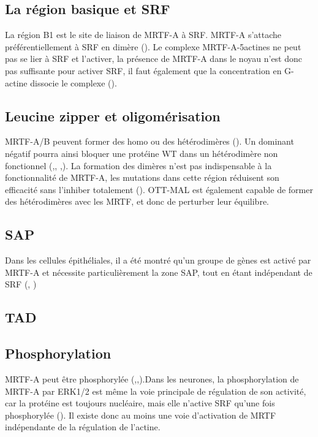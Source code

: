 \documentclass{report}
\begin{document}
 \subsection{La région basique et SRF}
 La région B1 est le site de liaison de MRTF-A à SRF. MRTF-A s'attache préférentiellement à SRF en dimère (\cite{miralles_actin_2003}). Le complexe MRTF-A-5actines ne peut pas se lier à SRF et l'activer, la présence de MRTF-A dans le noyau n'est donc pas suffisante pour activer SRF, il faut également que la concentration en G-actine dissocie le complexe (\cite{vartiainen_nuclear_2007}). 
 \subsection{Leucine zipper et oligomérisation}
 MRTF-A/B peuvent former des homo ou des hétérodimères (\cite{miralles_actin_2003}). Un dominant négatif pourra ainsi bloquer une protéine WT dans un hétérodimère non fonctionnel (\cite{selvaraj_megakaryoblastic_2003},\cite{cen_myocardin/mkl_2004}, \cite{li_requirement_2005},\cite{rajakyla_actin-regulated_2010}). La formation des dimères n'est pas indispensable à la fonctionnalité de MRTF-A, les mutations dans cette région réduisent son efficacité sans l'inhiber totalement (\cite{selvaraj_megakaryoblastic_2003}). 
 OTT-MAL est également capable de former des hétérodimères avec les MRTF, et donc de perturber leur équilibre. 
 
 \subsection{SAP}
 
Dans les cellules épithéliales, il a été montré qu'un groupe de gènes est activé par MRTF-A et nécessite particulièrement la zone SAP, tout en étant indépendant de SRF (\cite{asparuhova_transcriptional_2011}, \cite{gurbuz_sap_2014}) 
 
 
 \subsection{TAD}
 
 
 
 \subsection{Phosphorylation}
	MRTF-A peut être phosphorylée (\cite{miralles_actin_2003},\cite{cen_myocardin/mkl_2004},).Dans les neurones, la phosphorylation de MRTF-A par ERK1/2 est même la voie principale de régulation de son activité, car la protéine est toujours nucléaire, mais elle n'active SRF qu'une fois phosphorylée (\cite{kalita_role_2006}). Il existe donc au moins une voie d'activation de MRTF indépendante de la régulation de l'actine. 
	
\end{document}
